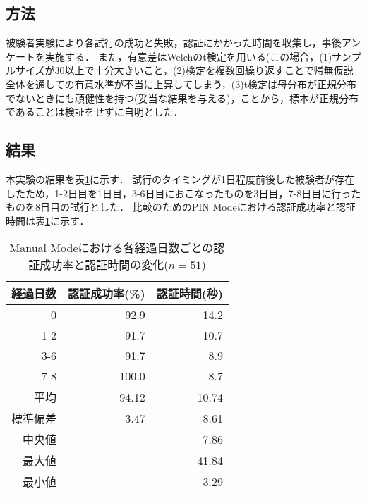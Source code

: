 \subsection{方法}
被験者実験により各試行の成功と失敗，認証にかかった時間を収集し，事後アンケートを実施する．
また，有意差はWelchのt検定を用いる(この場合，(1)サンプルサイズが30以上で十分大きいこと，(2)検定を複数回繰り返すことで帰無仮説全体を通しての有意水準が不当に上昇してしまう，(3)t検定は母分布が正規分布でないときにも頑健性を持つ(妥当な結果を与える)，ことから，標本が正規分布であることは検証をせずに自明とした．

\subsection{結果}
本実験の結果を表\ref{tab:manual.data}に示す．
試行のタイミングが1日程度前後した被験者が存在したため，1-2日目を1日目，3-6日目におこなったものを3日目，7-8日目に行ったものを8日目の試行とした．
比較のためのPIN Modeにおける認証成功率と認証時間は表\ref{tab:manual.data}に示す．

\begin{table}[t]
  \caption{Manual Modeにおける各経過日数ごとの認証成功率と認証時間の変化($ n = 51 $)}
  \label{tab:manual.data}
  \begin{center}
    \small
    \begin{tabular}{rrr}
      \bhline
      経過日数 & 認証成功率(\%) & 認証時間(秒)\\ \hline
      0    & 92.9 & 14.2 \\
      1-2 & 91.7 & 10.7 \\
      3-6 & 91.7 & 8.9 \\
      7-8 & 100.0 & 8.7 \\ \hline \hline
      平均 & 94.12 & 10.74 \\
      標準偏差 & 3.47 & 8.61 \\
      中央値       & & 7.86 \\
      最大値       & & 41.84 \\
      最小値       & & 3.29 \\
      \bhline
    \end{tabular}
  \end{center}
\end{table}

